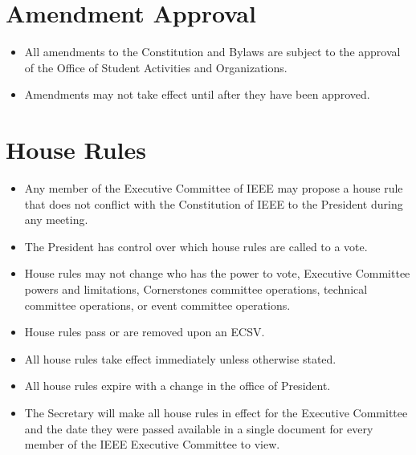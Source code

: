\documentclass[12pt]{constitution}
\begin{document}
\section{Amendment Approval}
\label{sec:amend_approve}
\begin{itemize}
    \item All amendments to the Constitution and Bylaws are subject to the approval of the Office of Student Activities and Organizations.
    \item Amendments may not take effect until after they have been approved.
\end{itemize}

\section{House Rules}
\label{sec:house_rules}
\begin{itemize}
\item Any member of the Executive Committee of IEEE may propose a house rule that does not conflict with the Constitution of IEEE to the President during any meeting.
\item The President has control over which house rules are called to a vote.
\item House rules may not change who has the power to vote, Executive Committee powers and limitations, Cornerstones committee operations, technical committee operations, or event committee operations.
\item House rules pass or are removed upon an ECSV.
\item All house rules take effect immediately unless otherwise stated.
\item All house rules expire with a change in the office of President.
\item The Secretary will make all house rules in effect for the Executive Committee and the date they were passed available in a single document for every member of the IEEE Executive Committee to view.
\end{itemize}
\end{document}

